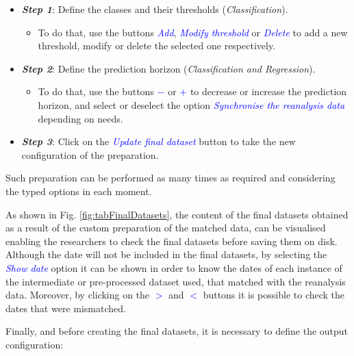 \begin{onehalfspace}
					\begin{itemize}
						\item \textit{\textbf{Step 1}}: Define the classes and their thresholds (\textit{Classification}).
							\begin{itemize}
								\item To do that, use the buttons \textcolor{blue}{\textit{Add}}, \textcolor{blue}{\textit{Modify threshold}} or \textcolor{blue}{\textit{Delete}} to add a new threshold, modify or delete the selected one respectively.
							\end{itemize}
						\item \textit{\textbf{Step 2}}: Define the prediction horizon (\textit{Classification and Regression}).
							\begin{itemize}
								\item To do that, use the buttons \textcolor{blue}{\textit{$-$}} or \textcolor{blue}{\textit{$+$}} to decrease or increase the prediction horizon, and select or deselect the option \textcolor{blue}{\textit{Synchronise the reanalysis data}} depending on needs.
							\end{itemize}
						\item \textit{\textbf{Step 3}}: Click on the \textcolor{blue}{\textit{Update final dataset}} button to take the new configuration of the preparation.
					\end{itemize}
					
				Such preparation can be performed as many times as required and considering the typed options in each moment.
					
				As shown in Fig. \ref{fig:tabFinalDatasets}, the content of the final datasets obtained as a result of the custom preparation of the matched data, can be visualised enabling the researchers to check the final datasets before saving them on disk. Although the date will not be included in the final datasets, by selecting the \textcolor{blue}{\textit{Show date}} option it can be shown in order to know the dates of each instance of the intermediate or pre-processed dataset used, that matched with the reanalysis data. Moreover, by clicking on the \textcolor{blue}{\textit{$>$}} and \textcolor{blue}{\textit{$<$}} buttons it is possible to check the dates that were mismatched.

				Finally, and before creating the final datasets, it is necessary to define the output configuration:
			
				\begin{itemize}


\end{itemize}
\end{onehalfspace}
